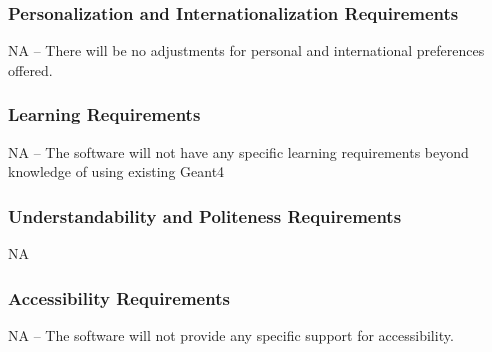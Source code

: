 \documentclass[12pt]{article}
\newcommand{\todo}[1]{\textcolor{red}{[TODO: #1]}} \else
\newcommand{\authornote}[3]{} \newcommand{\todo}[1]{} \fi
\newcommand{\ds}[1]{\authornote{blue}{DS}{#1}} %
\newcommand{\mmp}[1]{\authornote{green}{MP}{#1}}
\newcounter{ReqNumCounter}
\newcommand{\requirement}[8]{%
\fbox{\parbox{\textwidth}{%
\parbox[t]{.333\textwidth}{\raggedright%
\textbf{Req. \#}: \refstepcounter{ReqNumCounter} \arabic{ReqNumCounter} \label{#1}}%
\parbox[t]{.333\textwidth}{\centering%
\textbf{Req. Type}: \ref{#2}}%
\parbox[t]{.333\textwidth}{\raggedleft%
\textbf{Use Case \#}: \ref{#3}}
\newline\\
\textbf{Description}: #4\\\\
\textbf{Rationale}: #5\\\\
\textbf{Fit Criterion}: #6\\\\
\textbf{Priority}: #7 \hfill \textbf{History}: #8
}}}
\begin{document}
\subsubsection{Personalization and Internationalization Requirements}
NA -- There will be no adjustments for personal and international preferences offered.

\subsubsection{Learning Requirements}
NA -- The software will not have any specific learning requirements beyond knowledge of using existing Geant4

\subsubsection{Understandability and Politeness Requirements}
NA

\subsubsection{Accessibility Requirements}
NA -- The software will not provide any specific support for accessibility.
\end{document}
